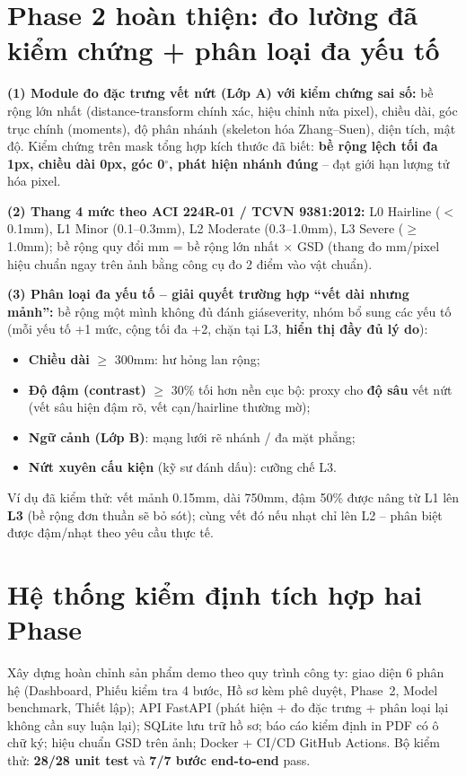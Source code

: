 \documentclass[12pt,a4paper]{article}
\begin{document}
\section{Phase 2 hoàn thiện: đo lường đã kiểm chứng + phân loại đa yếu tố}
\textbf{(1) Module đo đặc trưng vết nứt (Lớp A) với kiểm chứng sai số:} bề rộng lớn nhất (distance-transform chính xác, hiệu chỉnh nửa pixel), chiều dài, góc trục chính (moments), độ phân nhánh (skeleton hóa Zhang--Suen), diện tích, mật độ. Kiểm chứng trên mask tổng hợp kích thước đã biết: \textbf{bề rộng lệch tối đa 1px, chiều dài 0px, góc 0$^\circ$, phát hiện nhánh đúng} -- đạt giới hạn lượng tử hóa pixel.

\textbf{(2) Thang 4 mức theo ACI 224R-01 / TCVN 9381:2012:} L0 Hairline ($<$0.1mm), L1 Minor (0.1--0.3mm), L2 Moderate (0.3--1.0mm), L3 Severe ($\geq$1.0mm); bề rộng quy đổi mm = bề rộng lớn nhất $\times$ GSD (thang đo mm/pixel hiệu chuẩn ngay trên ảnh bằng công cụ đo 2 điểm vào vật chuẩn).

\textbf{(3) Phân loại đa yếu tố -- giải quyết trường hợp ``vết dài nhưng mảnh'':} bề rộng một mình không đủ đánh giáseverity, nhóm bổ sung các yếu tố (mỗi yếu tố +1 mức, cộng tối đa +2, chặn tại L3, \textbf{hiển thị đầy đủ lý do}):
\begin{itemize}[leftmargin=*]
    \item \textbf{Chiều dài} $\geq$ 300mm: hư hỏng lan rộng;
    \item \textbf{Độ đậm (contrast)} $\geq$ 30\% tối hơn nền cục bộ: proxy cho \textbf{độ sâu} vết nứt (vết sâu hiện đậm rõ, vết cạn/hairline thường mờ);
    \item \textbf{Ngữ cảnh (Lớp B)}: mạng lưới rẽ nhánh / đa mặt phẳng;
    \item \textbf{Nứt xuyên cấu kiện} (kỹ sư đánh dấu): cưỡng chế L3.
\end{itemize}
Ví dụ đã kiểm thử: vết mảnh 0.15mm, dài 750mm, đậm 50\% được nâng từ L1 lên \textbf{L3} (bề rộng đơn thuần sẽ bỏ sót); cùng vết đó nếu nhạt chỉ lên L2 -- phân biệt được đậm/nhạt theo yêu cầu thực tế.

\section{Hệ thống kiểm định tích hợp hai Phase}
Xây dựng hoàn chỉnh sản phẩm demo theo quy trình công ty: giao diện 6 phân hệ (Dashboard, Phiếu kiểm tra 4 bước, Hồ sơ kèm phê duyệt, Phase~2, Model benchmark, Thiết lập); API FastAPI (phát hiện + đo đặc trưng + phân loại lại không cần suy luận lại); SQLite lưu trữ hồ sơ; báo cáo kiểm định in PDF có ô chữ ký; hiệu chuẩn GSD trên ảnh; Docker + CI/CD GitHub Actions. Bộ kiểm thử: \textbf{28/28 unit test} và \textbf{7/7 bước end-to-end} pass.
\end{document}
